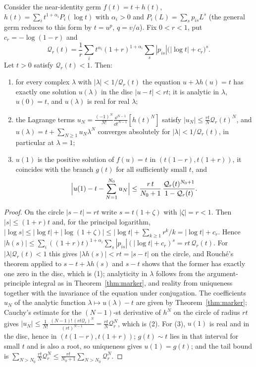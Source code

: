 \begin{theorem}
\label{thm:majorant}
Consider the near-identity germ $f(t)=t+h(t)$, $h(t)=\sum_it^{1+\alpha_i}P_i(\log t)$ with $\alpha_i>0$ and $P_i(L)=\sum_sp_{is}L^s$ (the general germ reduces to this form by $t=u^p$, $q=v/a$). Fix $0<r<1$, put $c_r=-\log(1-r)$ and
\begin{equation}
 \mathcal Q_r(t)=\frac1r\sum_it^{\alpha_i}(1+r)^{1+\alpha_i}\sum_s|p_{is}|\bigl(|\log t|+c_r\bigr)^s .
 \label{eq:Qr}
\end{equation}
Let $t>0$ satisfy $\mathcal Q_r(t)<1$. Then:
\begin{enumerate}[leftmargin=1.8em]
\item for every complex $\lambda$ with $|\lambda|<1/\mathcal Q_r(t)$ the equation $u+\lambda h(u)=t$ has exactly one solution $u(\lambda)$ in the disc $|u-t|<rt$; it is analytic in $\lambda$, $u(0)=t$, and $u(\lambda)$ is real for real $\lambda$;
\item the Lagrange terms $u_N=\frac{(-1)^N}{N!}\frac{\dd^{N-1}}{\dd t^{N-1}}[h(t)^N]$ satisfy $|u_N|\le\frac{rt}{N}\mathcal Q_r(t)^N$, and $u(\lambda)=t+\sum_{N\ge1}u_N\lambda^N$ converges absolutely for $|\lambda|<1/\mathcal Q_r(t)$, in particular at $\lambda=1$;
\item $u(1)$ is the positive solution of $f(u)=t$ in $(t(1-r),t(1+r))$, it coincides with the branch $g(t)$ for all sufficiently small $t$, and
\begin{equation}
 \Bigl|u(1)-t-\sum_{N=1}^{N_0}u_N\Bigr|\le\frac{r\,t}{N_0+1}\,\frac{\mathcal Q_r(t)^{N_0+1}}{1-\mathcal Q_r(t)} .
 \label{eq:tail-bound}
\end{equation}
\end{enumerate}
\end{theorem}
\begin{proof}
On the circle $|s-t|=rt$ write $s=t(1+\zeta)$ with $|\zeta|=r<1$. Then $|s|\le(1+r)t$ and, for the principal logarithm, $|\log s|\le|\log t|+|\log(1+\zeta)|\le|\log t|+\sum_{k\ge1}r^k/k=|\log t|+c_r$. Hence $|h(s)|\le\sum_i((1+r)t)^{1+\alpha_i}\sum_s|p_{is}|(|\log t|+c_r)^s=rt\,\mathcal Q_r(t)$. For $|\lambda|\mathcal Q_r(t)<1$ this gives $|\lambda h(s)|<rt=|s-t|$ on the circle, and Rouch\'e's theorem applied to $s-t+\lambda h(s)$ and $s-t$ shows that the former has exactly one zero in the disc, which is (1); analyticity in $\lambda$ follows from the argument-principle integral as in Theorem~\ref{thm:marker}, and reality from uniqueness together with the invariance of the equation under conjugation. The coefficients $u_N$ of the analytic function $\lambda\mapsto u(\lambda)-t$ are given by Theorem~\ref{thm:marker}; Cauchy's estimate for the $(N-1)$-st derivative of $h^N$ on the circle of radius $rt$ gives $|u_N|\le\frac1{N!}\,\frac{(N-1)!\,(rt\mathcal Q_r)^N}{(rt)^{N-1}}=\frac{rt}{N}\mathcal Q_r^N$, which is (2). For (3), $u(1)$ is real and in the disc, hence in $(t(1-r),t(1+r))$; $g(t)\sim t$ lies in that interval for small $t$ and is also a root, so uniqueness gives $u(1)=g(t)$; and the tail bound is $\sum_{N>N_0}\frac{rt}{N}\mathcal Q_r^N\le\frac{rt}{N_0+1}\sum_{N>N_0}\mathcal Q_r^N$.
\end{proof}

